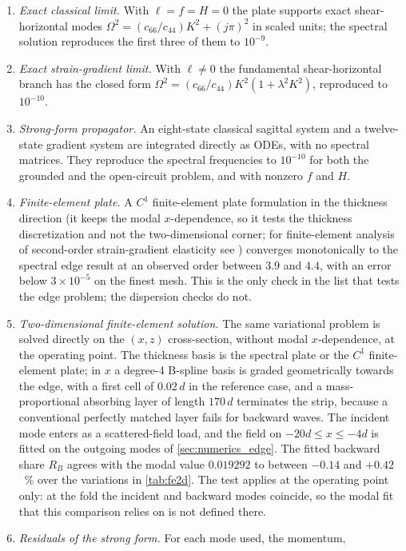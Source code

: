 \begin{enumerate}
\item \emph{Exact classical limit.}  With $\ell=f=H=0$ the plate supports
exact shear-horizontal modes $\Omega^{2}=(c_{66}/c_{44})K^{2}+(j\pi)^{2}$ in scaled
units; the spectral
solution reproduces the first three of them to $10^{-9}$.
\item \emph{Exact strain-gradient limit.}  With $\ell\neq0$ the fundamental
shear-horizontal branch has the closed form
$\Omega^{2}=(c_{66}/c_{44})K^{2}(1+\lambda^{2}K^{2})$, reproduced to $10^{-10}$.
\item \emph{Strong-form propagator.}  An eight-state classical
sagittal system and a twelve-state gradient system are integrated directly as
ODEs, with no spectral matrices.  They reproduce the spectral frequencies to
$10^{-10}$ for both the grounded and the open-circuit problem, and with
nonzero $f$ and $H$.
\item \emph{Finite-element plate.}  A $C^1$ finite-element plate
formulation in the thickness direction (it keeps the modal $x$-dependence, so it tests the thickness discretization and not the two-dimensional corner; for finite-element analysis of second-order strain-gradient elasticity see \cite{gupta2027ellipsoidal}) converges monotonically to the spectral
edge result at an observed order between $3.9$ and $4.4$, with an error below
$3\times10^{-5}$ on the finest mesh.  This is the only check in the list that tests the edge problem; the dispersion checks do not.
\item \emph{Two-dimensional finite-element solution.}  The same variational problem is solved directly on the $(x,z)$ cross-section, without modal $x$-dependence, at the operating point.  The thickness basis is the spectral plate or the $C^{1}$ finite-element plate; in $x$ a degree-4 B-spline basis is graded geometrically towards the edge, with a first cell of $0.02\,d$ in the reference case, and a mass-proportional absorbing layer of length $170\,d$ terminates the strip, because a conventional perfectly matched layer fails for backward waves.  The incident mode enters as a scattered-field load, and the field on $-20d\le x\le-4d$ is fitted on the outgoing modes of \cref{sec:numerics_edge}.  The fitted backward share $R_B$ agrees with the modal value $0.019292$ to between $-0.14$ and $+0.42$~\% over the variations in \cref{tab:fe2d}.  The test applies at the operating point only: at the fold the incident and backward modes coincide, so the modal fit that this comparison relies on is not defined there.
\item \emph{Residuals of the strong form.}  For each mode used, the momentum,

\end{enumerate}
